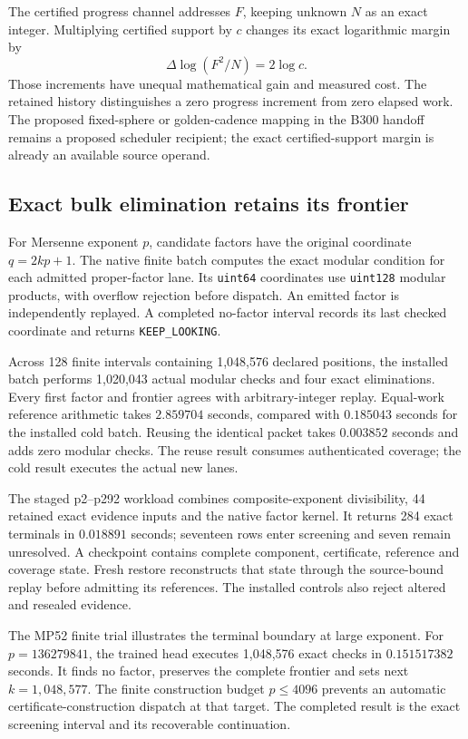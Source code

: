 The certified progress channel addresses \(F\), keeping unknown
\(N\) as an exact integer. Multiplying certified support by \(c\)
changes its exact logarithmic margin by
\[
 \Delta\log(F^2/N)=2\log c.
\]
Those increments have unequal mathematical gain and measured
cost. The retained history distinguishes a zero progress
increment from zero elapsed work. The proposed fixed-sphere or
golden-cadence mapping in the B300 handoff remains a proposed
scheduler recipient; the exact certified-support margin is
already an available source operand.

\subsection{Exact bulk elimination retains its frontier}

For Mersenne exponent \(p\), candidate factors have the original
coordinate \(q=2kp+1\). The native finite batch computes the exact
modular condition for each admitted proper-factor lane. Its
\texttt{uint64} coordinates use \texttt{uint128} modular products,
with overflow rejection before dispatch. An emitted factor is
independently replayed. A completed no-factor interval records
its last checked coordinate and returns
\texttt{KEEP\_LOOKING}.

Across 128 finite intervals containing 1,048,576 declared
positions, the installed batch performs 1,020,043 actual modular
checks and four exact eliminations. Every first factor and
frontier agrees with arbitrary-integer replay. Equal-work
reference arithmetic takes \(2.859704\) seconds, compared with
\(0.185043\) seconds for the installed cold batch. Reusing the
identical packet takes \(0.003852\) seconds and adds zero modular
checks. The reuse result consumes authenticated coverage;
the cold result executes the actual new lanes.

The staged p2--p292 workload combines composite-exponent
divisibility, 44 retained exact evidence inputs and the native
factor kernel. It returns 284 exact terminals in \(0.018891\)
seconds; seventeen rows enter screening and seven remain
unresolved. A checkpoint contains complete component,
certificate, reference and coverage state. Fresh restore
reconstructs that state through the source-bound replay before
admitting its references. The installed controls also reject
altered and resealed evidence.

The MP52 finite trial illustrates the terminal boundary at large
exponent. For \(p=136279841\), the trained head executes
1,048,576 exact checks in \(0.151517382\) seconds. It finds no
factor, preserves the complete frontier and sets next
\(k=1{,}048{,}577\). The finite construction budget
\(p\leq4096\) prevents an automatic certificate-construction
dispatch at that target. The completed result is the exact
screening interval and its recoverable continuation.

